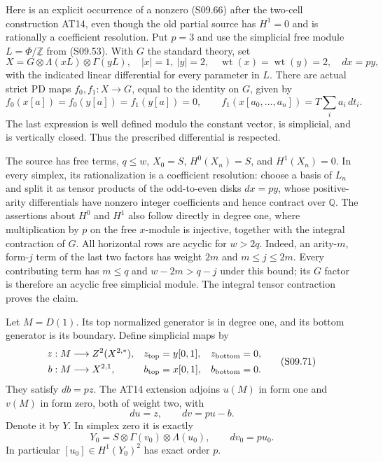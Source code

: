 Here is an explicit occurrence of a nonzero (S09.66)
after the two-cell construction AT14, even though
the old partial source has $H^1=0$ and is rationally
a coefficient resolution.  Put $p=3$ and use the
simplicial free module $L=\Phi/\underline{\mathbb Z}$
from (S09.53).  With $G$ the standard theory, set
\[
 X=G\otimes\Lambda(xL)\otimes\Gamma(yL),
 \quad |x|=1,\ |y|=2,\quad
 \operatorname{wt}(x)=\operatorname{wt}(y)=2,
 \quad dx=p y,
 \tag{S09.69}
\]
with the indicated linear differential for every
parameter in $L$.  There are actual strict PD maps
$f_0,f_1:X\to G$, equal to the identity on $G$, given by
\[
 f_0(x[a])=f_0(y[a])=f_1(y[a])=0,
 \qquad f_1(x[a_0,\ldots,a_n])
                    =T\sum_i a_i\,dt_i.
 \tag{S09.70}
\]
The last expression is well defined modulo the constant
vector, is simplicial, and is vertically closed.
Thus the prescribed differential is respected.

The source has free terms, $q\leq w$, $X_0=S$,
$H^0(X_n)=S$, and $H^1(X_n)=0$.  In every simplex,
its rationalization is a coefficient resolution:
choose a basis of $L_n$ and split it as tensor
products of the odd-to-even disks $dx=p y$,
whose positive-arity differentials have nonzero
integer coefficients and hence contract over
$\mathbb Q$.  The assertions about $H^0$ and $H^1$
also follow directly in degree one, where multiplication
by $p$ on the free $x$-module is injective, together
with the integral contraction of $G$.
All horizontal rows are acyclic for $w>2q$.
Indeed, an arity-$m$, form-$j$ term of the last two
factors has weight $2m$ and $m\leq j\leq2m$.
Every contributing term has $m\leq q$ and
$w-2m>q-j$ under this bound; its $G$ factor is
therefore an acyclic free simplicial module.
The integral tensor contraction proves the claim.

Let $M=D(1)$.  Its top normalized generator is in
degree one, and its bottom generator is its boundary.
Define simplicial maps by
\[
 \begin{aligned}
 z:M&\longrightarrow Z^2(X^{2,*}),&
 z_{\rm top}&=y[0,1],& z_{\rm bottom}&=0,\\
 b:M&\longrightarrow X^{2,1},&
 b_{\rm top}&=x[0,1],& b_{\rm bottom}&=0.
 \end{aligned}
 \tag{S09.71}
\]
They satisfy $db=pz$.  The AT14 extension adjoins
$u(M)$ in form one and $v(M)$ in form zero, both
of weight two, with
\[
                         du=z,\qquad dv=p u-b.
 \tag{S09.72}
\]
Denote it by $Y$.  In simplex zero it is exactly
\[
             Y_0=S\otimes\Gamma(v_0)\otimes\Lambda(u_0),
                        \qquad dv_0=p u_0.          \tag{S09.73}
\]
In particular $[u_0]\in H^1(Y_0)^2$ has exact order $p$.

